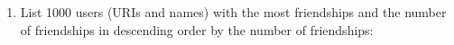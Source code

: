 \begin{enumerate}[leftmargin=0cm]
																																																																																																																																																																																																																																																																																																																																																																																																																																																																																																					\item List 1000 users (URIs and names) with the most friendships and the number of
																																																																																																																																																																																																																																																																																																																																																																																																																																																																																																							friendships in descending order by the number of friendships:\\

\end{enumerate}
